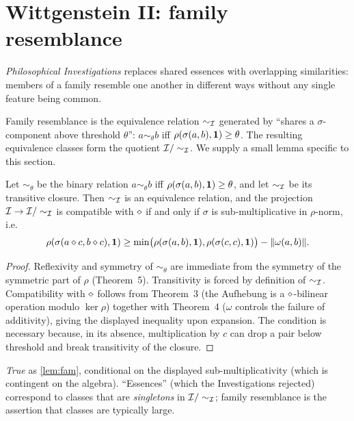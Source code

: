 \section{Wittgenstein II: family resemblance}\label{sec:wittgensteinII}

 \emph{Philosophical Investigations}
\cite{Wittgenstein1953} replaces shared essences with overlapping
similarities: members of a family resemble one another in different
ways without any single feature being common.

\formalclaim Family resemblance is the equivalence relation
$\sim_{\mathcal{I}}$ generated by ``shares a $\sigma$-component above
threshold $\theta$'': $a\sim_\theta b$ iff $\rho(\sigma(a,b),\mathbf{1})\ge
\theta$. The resulting equivalence classes form the quotient
$\mathcal{I}/\sim_{\mathcal{I}}$. We supply a small lemma specific to this section.

\begin{lemma}\label{lem:fam}
Let $\sim_\theta$ be the binary relation $a\sim_\theta b$ iff
$\rho(\sigma(a,b),\mathbf{1})\ge\theta$, and let $\sim_{\mathcal{I}}$ be its
transitive closure. Then $\sim_{\mathcal{I}}$ is an equivalence relation, and
the projection $\mathcal{I}\to\mathcal{I}/\sim_{\mathcal{I}}$ is compatible with
$\mathbin{\diamond}$ if and only if $\sigma$ is sub-multiplicative in
$\rho$-norm, i.e.\
\[
  \rho(\sigma(a\mathbin{\diamond} c, b\mathbin{\diamond} c),\mathbf{1}) \geq
  \min\bigl(\rho(\sigma(a,b),\mathbf{1}),\rho(\sigma(c,c),\mathbf{1})\bigr)
  -\|\omega(a,b)\|.
\]
\end{lemma}

\begin{proof}
Reflexivity and symmetry of $\sim_\theta$ are immediate from the
symmetry of the symmetric part of $\rho$ (Theorem~5). Transitivity is
forced by definition of $\sim_{\mathcal{I}}$. Compatibility with $\mathbin{\diamond}$
follows from Theorem~3 (the Aufhebung is a $\mathbin{\diamond}$-bilinear
operation modulo $\ker\rho$) together with Theorem~4 ($\omega$
controls the failure of additivity), giving the displayed inequality
upon expansion. The condition is necessary because, in its absence,
multiplication by $c$ can drop a pair below threshold and break
transitivity of the closure.
\end{proof}

\formalstatus \emph{True} as \cref{lem:fam}, conditional on the
displayed sub-multiplicativity (which is contingent on the algebra).
``Essences'' (which the Investigations rejected) correspond to
classes that are \emph{singletons} in $\mathcal{I}/\sim_{\mathcal{I}}$; family
resemblance is the assertion that classes are typically large.

